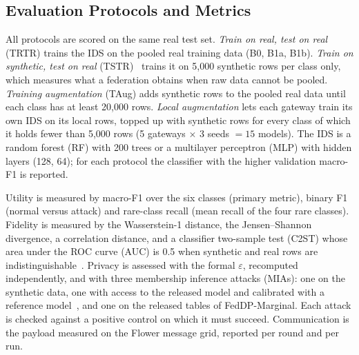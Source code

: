 \subsection{Evaluation Protocols and Metrics}
All protocols are scored on the same real test set. \textit{Train on real, test on real} (TRTR) trains the IDS on the pooled real training data (B0, B1a, B1b). \textit{Train on synthetic, test on real} (TSTR)~\cite{esteban2017} trains it on 5,000 synthetic rows per class only, which measures what a federation obtains when raw data cannot be pooled. \textit{Training augmentation} (TAug) adds synthetic rows to the pooled real data until each class has at least 20,000 rows. \textit{Local augmentation} lets each gateway train its own IDS on its local rows, topped up with synthetic rows for every class of which it holds fewer than 5,000 rows (5 gateways $\times$ 3 seeds $= 15$ models). The IDS is a random forest (RF) with 200 trees or a multilayer perceptron (MLP) with hidden layers (128, 64); for each protocol the classifier with the higher validation macro-F1 is reported.

Utility is measured by macro-F1 over the six classes (primary metric), binary F1 (normal versus attack) and rare-class recall (mean recall of the four rare classes). Fidelity is measured by the Wasserstein-1 distance, the Jensen--Shannon divergence, a correlation distance, and a classifier two-sample test (C2ST) whose area under the ROC curve (AUC) is 0.5 when synthetic and real rows are indistinguishable~\cite{lopezpaz2017}. Privacy is assessed with the formal $\varepsilon$, recomputed independently, and with three membership inference attacks (MIAs): one on the synthetic data, one with access to the released model and calibrated with a reference model~\cite{carlini2022}, and one on the released tables of FedDP-Marginal. Each attack is checked against a positive control on which it must succeed. Communication is the payload measured on the Flower message grid, reported per round and per run.

